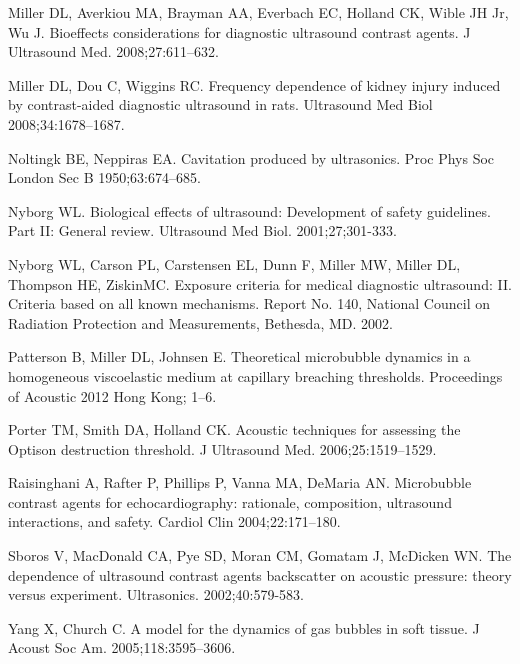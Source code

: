 \documentclass[%
preprint,%
author-year,%
]{jasatex}
\begin{document}
\begin{thebibliography}{00}
  
 Miller DL, Averkiou
  MA, Brayman AA, Everbach EC, Holland CK, Wible JH Jr, Wu
  J. Bioeffects considerations for diagnostic ultrasound contrast
  agents. J Ultrasound Med. 2008;27:611--632.

 Miller DL, Dou C,
  Wiggins RC. Frequency dependence of kidney injury induced by
  contrast-aided diagnostic ultrasound in rats. Ultrasound Med Biol
  2008;34:1678--1687.

 Noltingk BE,
  Neppiras EA. Cavitation produced by ultrasonics. Proc Phys Soc
  London Sec B 1950;63:674--685.

 Nyborg WL.  Biological effects of
  ultrasound: Development of safety guidelines. Part II: General
  review.  Ultrasound Med Biol.  2001;27;301-333.

 Nyborg WL, Carson PL, Carstensen EL,
  Dunn F, Miller MW, Miller DL, Thompson HE, ZiskinMC. Exposure criteria
  for medical diagnostic ultrasound: II. Criteria based on all known
  mechanisms. Report No. 140, National Council on Radiation Protection 
  and Measurements, Bethesda, MD. 2002.

 Patterson B,
  Miller DL, Johnsen E. Theoretical microbubble dynamics in a
  homogeneous viscoelastic medium at capillary breaching
  thresholds. Proceedings of Acoustic 2012 Hong Kong; 1--6.

 Porter TM, Smith DA,
  Holland CK.  Acoustic techniques for assessing the Optison
  destruction threshold. J Ultrasound Med. 2006;25:1519--1529.
  
 Raisinghani
  A, Rafter P, Phillips P, Vanna MA, DeMaria AN. Microbubble contrast
  agents for echocardiography: rationale, composition, ultrasound
  interactions, and safety. Cardiol Clin 2004;22:171--180.
  
 Sboros V, MacDonald
  CA, Pye SD, Moran CM, Gomatam J, McDicken WN. The dependence of
  ultrasound contrast agents backscatter on acoustic pressure: theory
  versus experiment. Ultrasonics. 2002;40:579-583.

 Yang X, Church C. A model for
  the dynamics of gas bubbles in soft tissue. J Acoust Soc
  Am. 2005;118:3595--3606.

\end{thebibliography}
\end{document}
